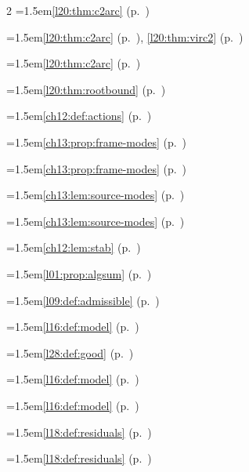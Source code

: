 \begin{multicols}{2}
\hangindent=1.5em\quad \ref{l20:thm:c2arc} (p.~\pageref{l20:thm:c2arc})\par
\hangindent=1.5em\quad \ref{l20:thm:c2arc} (p.~\pageref{l20:thm:c2arc}), \ref{l20:thm:virc2} (p.~\pageref{l20:thm:virc2})\par
\hangindent=1.5em\quad \ref{l20:thm:c2arc} (p.~\pageref{l20:thm:c2arc})\par
\hangindent=1.5em\quad \ref{l20:thm:rootbound} (p.~\pageref{l20:thm:rootbound})\par
\hangindent=1.5em\quad \ref{ch12:def:actions} (p.~\pageref{ch12:def:actions})\par
\hangindent=1.5em\quad \ref{ch13:prop:frame-modes} (p.~\pageref{ch13:prop:frame-modes})\par
\hangindent=1.5em\quad \ref{ch13:prop:frame-modes} (p.~\pageref{ch13:prop:frame-modes})\par
\hangindent=1.5em\quad \ref{ch13:lem:source-modes} (p.~\pageref{ch13:lem:source-modes})\par
\hangindent=1.5em\quad \ref{ch13:lem:source-modes} (p.~\pageref{ch13:lem:source-modes})\par
\hangindent=1.5em\quad \ref{ch12:lem:stab} (p.~\pageref{ch12:lem:stab})\par
\hangindent=1.5em\quad \ref{l01:prop:algsum} (p.~\pageref{l01:prop:algsum})\par
\hangindent=1.5em\quad \ref{l09:def:admissible} (p.~\pageref{l09:def:admissible})\par
\hangindent=1.5em\quad \ref{l16:def:model} (p.~\pageref{l16:def:model})\par
\hangindent=1.5em\quad \ref{l28:def:good} (p.~\pageref{l28:def:good})\par
\hangindent=1.5em\quad \ref{l16:def:model} (p.~\pageref{l16:def:model})\par
\hangindent=1.5em\quad \ref{l16:def:model} (p.~\pageref{l16:def:model})\par
\hangindent=1.5em\quad \ref{l18:def:residuals} (p.~\pageref{l18:def:residuals})\par
\hangindent=1.5em\quad \ref{l18:def:residuals} (p.~\pageref{l18:def:residuals})\par

\end{multicols}
